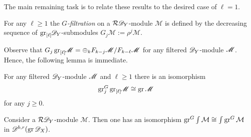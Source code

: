 The main remaining task is to relate these results to the desired case of $\ell = 1$.
\begin{definition}
  For any $\ell \geq 1$ the {\it $G$-filtration} on a $\mathcal{R}\mathscr{D}_Y$-module $\mathcal{M}$ is defined by the decreasing sequence of $\operatorname{gr}_{[\ell]}\mkern-5mu\mathscr{D}_Y$-submodules $G_j \mathcal{M} := \rho^{j}\mathcal{M}$.
\end{definition}
Observe that $G_j\operatorname{gr}_{[\ell]}\mkern-5mu\mathscr{M} = \oplus_k F_{k-j}\mathscr{M} /F_{k-\ell}\mathscr{M}$ for any filtered $\mathscr{D}_Y$-module $\mathscr{M}$.
Hence, the following lemma is immediate.
\begin{lemma}\label{lem: GradedGGradedLYieldsGraded}
  For any filtered $\mathscr{D}_Y$-module $\mathscr{M}$ and $\ell \geq 1$ there is an isomorphism
  $$\operatorname{gr}^G_j \operatorname{gr}_{[\ell]}\mkern-5mu \mathscr{M} \cong \operatorname{gr}\mathscr{M}$$
  for any $j\geq 0$.
\end{lemma}
\begin{lemma}\label{lem: grGCommutes}
  Consider a $\mathcal{R}\mathscr{D}_Y$-module $\mathcal{M}$.
  Then one has an isomorphism $\operatorname{gr}^G\int\mathcal{M} \cong \int\operatorname{gr}^G\mathcal{M}$ in $\mathscr{D}^{b,r}(\operatorname{gr}\mathscr{D}_X)$.
\end{lemma}
